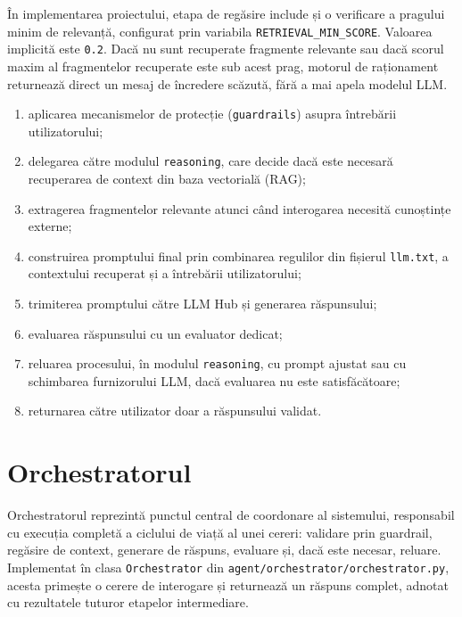 \documentclass[12pt, a4paper, oneside, romanian]{teza-upb}
\begin{document}
În implementarea proiectului, etapa de regăsire include și o verificare a pragului minim de relevanță, configurat prin variabila \texttt{RETRIEVAL\_MIN\_SCORE}. Valoarea implicită este \texttt{0.2}. Dacă nu sunt recuperate fragmente relevante sau dacă scorul maxim al fragmentelor recuperate este sub acest prag, motorul de raționament returnează direct un mesaj de încredere scăzută, fără a mai apela modelul LLM.

\begin{enumerate}
    \item aplicarea mecanismelor de protecție (\texttt{guardrails}) asupra întrebării utilizatorului;
    \item delegarea către modulul \texttt{reasoning}, care decide dacă este necesară recuperarea de context din baza vectorială (RAG);
    \item extragerea fragmentelor relevante atunci când interogarea necesită cunoștințe externe;
    \item construirea promptului final prin combinarea regulilor din fișierul \texttt{llm.txt}, a contextului recuperat și a întrebării utilizatorului;
    \item trimiterea promptului către LLM Hub și generarea răspunsului;
    \item evaluarea răspunsului cu un evaluator dedicat;
    \item reluarea procesului, în modulul \texttt{reasoning}, cu prompt ajustat sau cu schimbarea furnizorului LLM, dacă evaluarea nu este satisfăcătoare;
    \item returnarea către utilizator doar a răspunsului validat.
\end{enumerate}


\section{Orchestratorul}

Orchestratorul reprezintă punctul central de coordonare al sistemului, responsabil cu execuția completă a ciclului de viață al unei cereri: validare prin guardrail, regăsire de context, generare de răspuns, evaluare și, dacă este necesar, reluare. Implementat în clasa \texttt{Orchestrator} din \texttt{agent/orchestrator/orchestrator.py}, acesta primește o cerere de interogare și returnează un răspuns complet, adnotat cu rezultatele tuturor etapelor intermediare.
\end{document}

